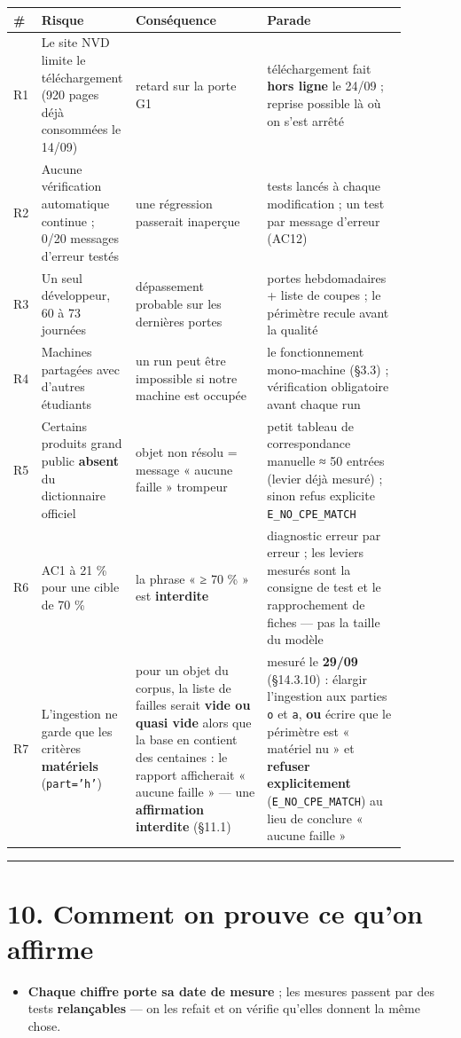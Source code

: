 \documentclass[11pt,a4paper]{article}
\begin{document}
\begin{longtable}{|p{0.065\linewidth}|p{0.123\linewidth}|p{0.338\linewidth}|p{0.358\linewidth}|}
\hline
\textbf{\#} & \textbf{Risque} & \textbf{Conséquence} & \textbf{Parade} \\ \hline
\endhead
R1 & Le site NVD limite le téléchargement (920 pages déjà consommées le 14/09) & retard sur la porte G1 & téléchargement fait \textbf{hors ligne} le 24/09 ; reprise possible là où on s'est arrêté \\ \hline
R2 & Aucune vérification automatique continue ; 0/20 messages d'erreur testés & une régression passerait inaperçue & tests lancés à chaque modification ; un test par message d'erreur (AC12) \\ \hline
R3 & Un seul développeur, 60 à 73 journées & dépassement probable sur les dernières portes & portes hebdomadaires + liste de coupes ; le périmètre recule avant la qualité \\ \hline
R4 & Machines partagées avec d'autres étudiants & un run peut être impossible si notre machine est occupée & le fonctionnement mono-machine (§3.3) ; vérification obligatoire avant chaque run \\ \hline
R5 & Certains produits grand public \textbf{absent} du dictionnaire officiel & objet non résolu = message « aucune faille » trompeur & petit tableau de correspondance manuelle ≈ 50 entrées (levier déjà mesuré) ; sinon refus explicite \texttt{E\_\allowbreak{}NO\_\allowbreak{}CPE\_\allowbreak{}MATCH} \\ \hline
R6 & AC1 à 21 \% pour une cible de 70 \% & la phrase « ≥ 70 \% » est \textbf{interdite} & diagnostic erreur par erreur ; les leviers mesurés sont la consigne de test et le rapprochement de fiches — pas la taille du modèle \\ \hline
R7 & L'ingestion ne garde que les critères \textbf{matériels} (\texttt{part='h'}) & pour un objet du corpus, la liste de failles serait \textbf{vide ou quasi vide} alors que la base en contient des centaines : le rapport afficherait « aucune faille » — une \textbf{affirmation interdite} (§11.1) & mesuré le \textbf{29/09} (§14.3.10) : élargir l'ingestion aux parties \texttt{o} et \texttt{a}, \textbf{ou} écrire que le périmètre est « matériel nu » et \textbf{refuser explicitement} (\texttt{E\_\allowbreak{}NO\_\allowbreak{}CPE\_\allowbreak{}MATCH}) au lieu de conclure « aucune faille » \\ \hline
\end{longtable}
\medskip\hrule\medskip
\section*{10. Comment on prouve ce qu'on affirme}
\begin{itemize}  \item \textbf{Chaque chiffre porte sa date de mesure} ; les mesures passent par des tests \textbf{relançables} — on les refait et on vérifie qu'elles donnent la même chose.
\end{itemize}
\end{document}
